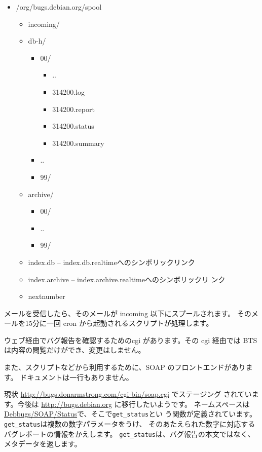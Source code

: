 \documentclass[mingoth,a4paper]{jsarticle}
\begin{document}
\begin{itemize}
 \item /org/bugs.debian.org/spool
       \begin{itemize}
	\item incoming/
	\item db-h/
	      \begin{itemize}
	       \item 00/
		     \begin{itemize}
		      \item ..
		      \item 314200.log
		      \item 314200.report
		      \item 314200.status
		      \item 314200.summary
		     \end{itemize}
	       \item ..
	       \item 99/
	      \end{itemize}
	\item archive/
	      \begin{itemize}
	       \item 00/
	       \item ..
	       \item 99/
	      \end{itemize}
	\item index.db -- index.db.realtimeへのシンボリックリンク
	\item index.archive -- index.archive.realtimeへのシンボリックリ
	      ンク
	\item nextnumber
       \end{itemize}
\end{itemize}

メールを受信したら、そのメールが incoming 以下にスプールされます。
そのメールを15分に一回 cron から起動されるスクリプトが処理します。


ウェブ経由でバグ報告を確認するためのcgi があります。その cgi 経由では 
BTS は内容の閲覧だけができ、変更はしません。

また、スクリプトなどから利用するために、SOAP のフロントエンドがあります。
ドキュメントは一行もありません。

現状 \url{http://bugs.donarmstrong.com/cgi-bin/soap.cgi} でステージング
されています。今後は \url{http://bugs.debian.org} に移行したいようです。
ネームスペースは\url{Debbugs/SOAP/Status}で、そこで\verb!get_status!とい
う関数が定義されています。\verb!get_status!は複数の数字パラメータをうけ、
そのあたえられた数字に対応するバグレポートの情報をかえします。
\verb!get_status!は、バグ報告の本文ではなく、メタデータを返します。
\end{document}
